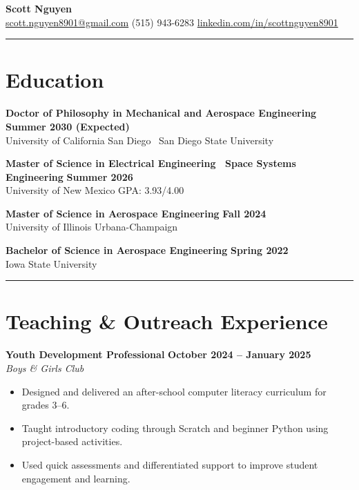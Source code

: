 \documentclass[10pt]{article}
\newcommand{\sectionline}{\noindent\rule{\linewidth}{0.4pt}}
\begin{document}
	
	\begin{center}
		{\color{mygreen}
			{\Huge \textbf{Scott Nguyen}} \\
			\small
			\href{mailto:scott.nguyen8901@gmail.com}{scott.nguyen8901@gmail.com} \textbar
			(515) 943-6283 \textbar
			\href{https://www.linkedin.com/in/scottnguyen8901/}{linkedin.com/in/scottnguyen8901}
		}
	\end{center}
	
	\sectionline

	\section*{Education}
	
	\textbf{Doctor of Philosophy in Mechanical and Aerospace Engineering} \hfill \textbf{Summer 2030 (Expected)} \\
	University of California San Diego \textbar\ San Diego State University
	
	\textbf{Master of Science in Electrical Engineering \textbar\ Space Systems Engineering} \hfill \textbf{Summer 2026} \\
	University of New Mexico \hfill GPA: 3.93/4.00
	
	\textbf{Master of Science in Aerospace Engineering} \hfill \textbf{Fall 2024} \\
	University of Illinois Urbana-Champaign
	
	\textbf{Bachelor of Science in Aerospace Engineering} \hfill \textbf{Spring 2022} \\
	Iowa State University
	
	\sectionline
	
	\section*{Teaching \& Outreach Experience}
	
	\textbf{Youth Development Professional} \hfill \textbf{October 2024 -- January 2025} \\
	\emph{Boys \& Girls Club}
	\begin{itemize}
		\item Designed and delivered an after-school computer literacy curriculum for grades 3--6.
		\item Taught introductory coding through Scratch and beginner Python using project-based activities.
		\item Used quick assessments and differentiated support to improve student engagement and learning.
	\end{itemize}
	
\end{document}
